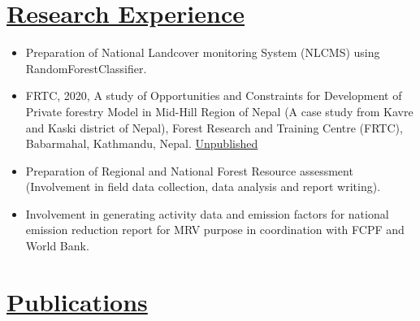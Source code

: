 \documentclass[
]{article}
\begin{document}
\section{\texorpdfstring{\underline{Research Experience}}{}}\label{section-2}

\begin{itemize}
\item
  Preparation of National Landcover monitoring System (NLCMS) using
  RandomForestClassifier.
\item
  FRTC, 2020, A study of Opportunities and Constraints for Development
  of Private forestry Model in Mid-Hill Region of Nepal (A case study
  from Kavre and Kaski district of Nepal), Forest Research and Training
  Centre (FRTC), Babarmahal, Kathmandu, Nepal.
  \href{https://frtc.gov.np/uploads/files/Private\%20forest\%20Model(1).pdf}{Unpublished}
\item
  Preparation of Regional and National Forest Resource assessment
  (Involvement in field data collection, data analysis and report
  writing).
\item
  Involvement in generating activity data and emission factors for
  national emission reduction report for MRV purpose in coordination
  with FCPF and World Bank.
\end{itemize}

\section{\texorpdfstring{\underline{Publications}}{}}\label{section-3}
\end{document}
